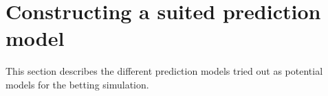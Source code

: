 \section{Constructing a suited prediction model}

This section describes the different prediction models tried out as potential models for the betting simulation.